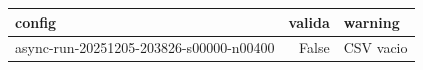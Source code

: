 \begin{tabular}{lrl}
\toprule
config & valida & warning \\
\midrule
async-run-20251205-203826-s00000-n00400 & False & CSV vacio \\
\bottomrule
\end{tabular}

